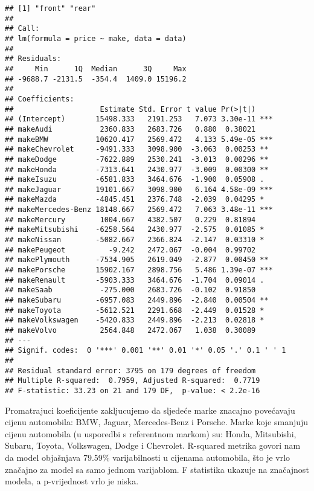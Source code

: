 \documentclass[
]{article}
\begin{document}
\begin{verbatim}
## [1] "front" "rear" 
## 
## Call:
## lm(formula = price ~ make, data = data)
## 
## Residuals:
##     Min      1Q  Median      3Q     Max 
## -9688.7 -2131.5  -354.4  1409.0 15196.2 
## 
## Coefficients:
##                    Estimate Std. Error t value Pr(>|t|)    
## (Intercept)       15498.333   2191.253   7.073 3.30e-11 ***
## makeAudi           2360.833   2683.726   0.880  0.38021    
## makeBMW           10620.417   2569.472   4.133 5.49e-05 ***
## makeChevrolet     -9491.333   3098.900  -3.063  0.00253 ** 
## makeDodge         -7622.889   2530.241  -3.013  0.00296 ** 
## makeHonda         -7313.641   2430.977  -3.009  0.00300 ** 
## makeIsuzu         -6581.833   3464.676  -1.900  0.05908 .  
## makeJaguar        19101.667   3098.900   6.164 4.58e-09 ***
## makeMazda         -4845.451   2376.748  -2.039  0.04295 *  
## makeMercedes-Benz 18148.667   2569.472   7.063 3.48e-11 ***
## makeMercury        1004.667   4382.507   0.229  0.81894    
## makeMitsubishi    -6258.564   2430.977  -2.575  0.01085 *  
## makeNissan        -5082.667   2366.824  -2.147  0.03310 *  
## makePeugeot          -9.242   2472.067  -0.004  0.99702    
## makePlymouth      -7534.905   2619.049  -2.877  0.00450 ** 
## makePorsche       15902.167   2898.756   5.486 1.39e-07 ***
## makeRenault       -5903.333   3464.676  -1.704  0.09014 .  
## makeSaab           -275.000   2683.726  -0.102  0.91850    
## makeSubaru        -6957.083   2449.896  -2.840  0.00504 ** 
## makeToyota        -5612.521   2291.668  -2.449  0.01528 *  
## makeVolkswagen    -5420.833   2449.896  -2.213  0.02818 *  
## makeVolvo          2564.848   2472.067   1.038  0.30089    
## ---
## Signif. codes:  0 '***' 0.001 '**' 0.01 '*' 0.05 '.' 0.1 ' ' 1
## 
## Residual standard error: 3795 on 179 degrees of freedom
## Multiple R-squared:  0.7959, Adjusted R-squared:  0.7719 
## F-statistic: 33.23 on 21 and 179 DF,  p-value: < 2.2e-16
\end{verbatim}

Promatrajuci koeficijente zakljucujemo da sljedeće marke znacajno
povećavaju cijenu automobila: BMW, Jaguar, Mercedes-Benz i Porsche.
Marke koje smanjuju cijenu automobila (u usporedbi s referentnom markom)
su: Honda, Mitsubishi, Subaru, Toyota, Volkswagen, Dodge i Chevrolet.
R-squared metrika govori nam da model objašnjava 79.59\% varijabilnosti
u cijenama automobila, što je vrlo značajno za model sa samo jednom
varijablom. F statistika ukazuje na značajnost modela, a p-vrijednost
vrlo je niska.
\end{document}
